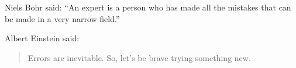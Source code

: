 \documentclass{article}
\begin{document}
    Niels Bohr said: ``An expert is a person who has made
    all the mistakes that can be made in a very narrow field.''

    Albert Einstein said:
    \begin{quote}
        Errors are inevitable. So, let's be brave trying something new.
    \end{quote}
\end{document}
